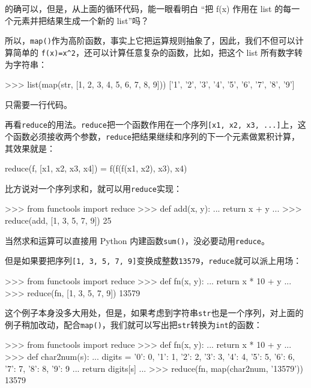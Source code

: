 的确可以，但是，从上面的循环代码，能一眼看明白 ``把 f(x) 作用在 list
的每一个元素并把结果生成一个新的 list''吗？

所以，\texttt{map()}作为高阶函数，事实上它把运算规则抽象了，因此，我们不但可以计算简单的
\texttt{f(x)=x\^{}2}，还可以计算任意复杂的函数，比如，把这个 list
所有数字转为字符串：

\begin{pythoncode}
>>> list(map(str, [1, 2, 3, 4, 5, 6, 7, 8, 9]))
['1', '2', '3', '4', '5', '6', '7', '8', '9']
\end{pythoncode}

只需要一行代码。

再看\texttt{reduce}的用法。\texttt{reduce}把一个函数作用在一个序列\texttt{{[}x1,\ x2,\ x3,\ ...{]}}上，这个函数必须接收两个参数，\texttt{reduce}把结果继续和序列的下一个元素做累积计算，其效果就是：

\begin{pythoncode}
reduce(f, [x1, x2, x3, x4]) = f(f(f(x1, x2), x3), x4)
\end{pythoncode}

比方说对一个序列求和，就可以用\texttt{reduce}实现：

\begin{pythoncode}
>>> from functools import reduce
>>> def add(x, y):
...     return x + y
...
>>> reduce(add, [1, 3, 5, 7, 9])
25
\end{pythoncode}

当然求和运算可以直接用 Python
内建函数\texttt{sum()}，没必要动用\texttt{reduce}。

但是如果要把序列\texttt{{[}1,\ 3,\ 5,\ 7,\ 9{]}}变换成整数\texttt{13579}，\texttt{reduce}就可以派上用场：

\begin{pythoncode}
>>> from functools import reduce
>>> def fn(x, y):
...     return x * 10 + y
...
>>> reduce(fn, [1, 3, 5, 7, 9])
13579
\end{pythoncode}

这个例子本身没多大用处，但是，如果考虑到字符串\texttt{str}也是一个序列，对上面的例子稍加改动，配合\texttt{map()}，我们就可以写出把\texttt{str}转换为\texttt{int}的函数：

\begin{pythoncode}
>>> from functools import reduce
>>> def fn(x, y):
...     return x * 10 + y
...
>>> def char2num(s):
...     digits = {'0': 0, '1': 1, '2': 2, '3': 3, '4': 4, '5': 5, '6': 6, '7': 7, '8': 8, '9': 9}
...     return digits[s]
...
>>> reduce(fn, map(char2num, '13579'))
13579
\end{pythoncode}

